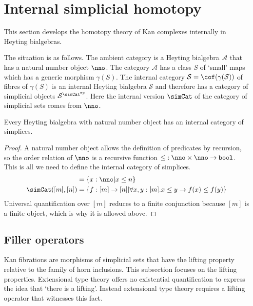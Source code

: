 \documentclass{tac}
\newcommand\hide[1]{}
\newcommand\cat\mathcal
\newcommand\set[1]{\left\{#1\right\}}
\newcommand\dual{^{\mathrm{op}}}
\newcommand\s{^{\simCat\dual}}
\newcommand\of{:}
\newcommand\gen\gamma
\newcommand\bool{\mathtt{bool}}
\begin{document}
\hide{Move stuff on discrete isofibrations here?}

\section{Internal simplicial homotopy}
This section develops the homotopy theory of Kan complexes internally in Heyting bialgebras. 

The situation is as follows. The ambient category is a Heyting bialgebra $\cat A$ that has a natural number object $\nno$. The category $\cat A$ has a class $S$ of `small' maps which has a generic morphism $\gen(S)$. The internal category $\cat S = \cof(\gen(\cat S))$ of fibres of $\gen(S)$ is an internal Heyting bialgebra $\cat S$ and therefore has a category of simplicial objects $\cat S\s$. Here the internal version $\simCat$ of the category of simplicial sets comes from $\nno$.

\begin{proposition} Every Heyting bialgebra with natural number object has an internal category of simplices.\end{proposition}

\begin{proof} A natural number object allows the definition of predicates by recursion, so the order relation of $\nno$ is a recursive function $\mathord\leq\of\nno\times \nno \to \bool$. This is all we need to define the internal category of simplices.
\begin{align*}
[n] &= \set{x\of\nno\middle| x\leq n}\\
\simCat([m],[n]) &= \set{f\of[m]\to[n]\middle|\forall x,y\of [m].x\leq y\to f(x)\leq f(y)}
\end{align*}
Universal quantification over $[m]$ reduces to a finite conjunction because $[m]$ is a finite object, which is why it is allowed above. 
\end{proof}

\subsection{Filler operators}
Kan fibrations are morphisms of simplicial sets that have the lifting property relative to the family of horn inclusions. This subsection focuses on the lifting properties. Extensional type theory offers no existential quantification to express the idea that `there is a lifting'. Instead extensional type theory requires a lifting operator that witnesses this fact.
\end{document}
